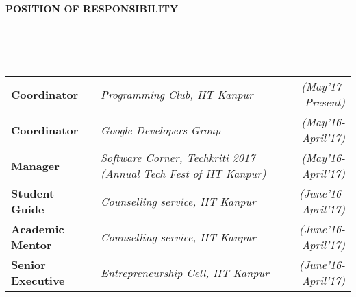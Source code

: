 \documentclass[a4paper,10pt]{article}
\newcommand{\lsep}{-0.5cm}
\newcommand{\resheading}[1]{{\small \colorbox{mygrey}{\begin{minipage}{0.975\textwidth}{\textbf{#1 \vphantom{p\^{E}}}}\end{minipage}}}}
\begin{document}
\resheading{\textbf{POSITION OF RESPONSIBILITY} }\\[\lsep]
\\ \\ \indent
\begin{tabular}{l @{\hskip 0.5in}l @{\hskip 0.3in}r }
\textbf{Coordinator} & \textit{Programming Club, IIT Kanpur} & \emph{(May'17-Present)}\\
\textbf{Coordinator} & \textit{Google Developers Group} &
\emph{(May'16-April'17)}\\
\textbf{Manager} & \textit{Software Corner, Techkriti 2017 (Annual Tech Fest of IIT Kanpur)} &
\emph{(May'16-April'17)}\\
\textbf{Student Guide} & \textit{Counselling service, IIT Kanpur} & \emph{(June'16-April'17)}\\
\textbf{Academic Mentor} & \textit{Counselling service, IIT Kanpur} & \emph{(June'16-April'17)}\\
\textbf{Senior Executive} & \textit{Entrepreneurship Cell, IIT Kanpur} & \emph{(June'16-April'17)}\\
\end{tabular}
\end{document}
